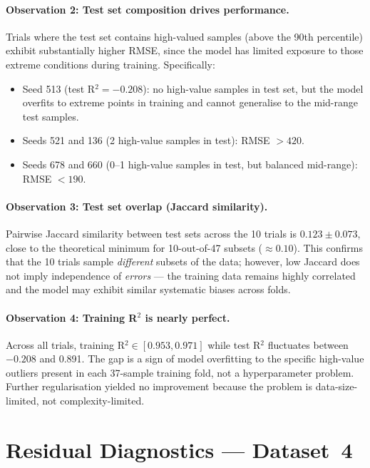 \documentclass[12pt,a4paper]{article}
\begin{document}
\paragraph{Observation 2: Test set composition drives performance.}
Trials where the test set
contains high-valued samples (above the 90th percentile) exhibit
substantially higher RMSE, since the model has limited exposure to those
extreme conditions during training.  Specifically:
\begin{itemize}[leftmargin=*]
  \item Seed 513 (test R$^2 = -0.208$): no high-value samples in test set,
        but the model overfits to extreme points in training and cannot
        generalise to the mid-range test samples.
  \item Seeds 521 and 136 (2 high-value samples in test): RMSE $>420$.
  \item Seeds 678 and 660 (0--1 high-value samples in test, but balanced
        mid-range): RMSE $<190$.
\end{itemize}

\paragraph{Observation 3: Test set overlap (Jaccard similarity).}
Pairwise Jaccard similarity between test sets across the 10 trials is
$0.123 \pm 0.073$, close to the theoretical minimum for 10-out-of-47
subsets ($\approx 0.10$).  This confirms that the 10 trials sample
\emph{different} subsets of the data; however, low Jaccard does not imply
independence of \emph{errors} — the training data remains highly correlated
and the model may exhibit similar systematic biases across folds.

\paragraph{Observation 4: Training R$^2$ is nearly perfect.}
Across all trials, training R$^2 \in [0.953, 0.971]$ while test R$^2$
fluctuates between $-0.208$ and 0.891.  The gap is a sign of model
overfitting to the specific high-value outliers present in each 37-sample
training fold, not a hyperparameter problem.  Further regularisation
yielded no improvement because the problem is data-size-limited, not
complexity-limited.

\section{Residual Diagnostics — Dataset~4}
\label{sec:residual_diagnostics}
\end{document}
